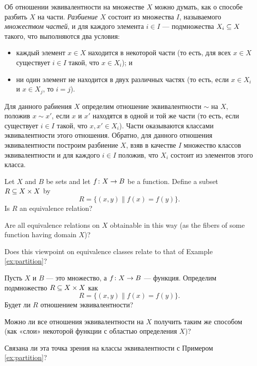 \documentclass[CT4S-EN-RU]{subfiles}
\begin{document}
\begin{exampleRUS}[Разбиения]\label{ex:partition}
Об отношении эквивалентности на множестве $X$ можно думать, как о способе разбить $X$ на части. {\em Разбиение $X$} состоит из множества $I$, называемого {\em множеством частей}, и для каждого элемента $i\in I$ — подмножества $X_i\ss X$ такого, что выполняются два условия:
\begin{itemize}
\item каждый элемент $x\in X$ находится в некоторой части (то есть, для всех $x\in X$ существует $i\in I$ такой, что $x\in X_i$); и
\item ни один элемент не находится в двух различных частях (то есть, если $x\in X_i$ и $x\in X_j$, то $i=j$).
\end{itemize}

Для данного рабиения $X$ определим отношение эквивалентности $\sim$ на $X$, положив $x\sim x'$, если $x$ и $x'$ находятся в одной и той же части (то есть, если существует $i\in I$ такой, что $x,x'\in X_i$). Части оказываются классами эквивалентности этого отношения. Обратно, для данного отношения эквивалентности построим разбиение $X$, взяв в качестве $I$ множество классов эквивалентности и для каждого $i\in I$ положив, что $X_i$ состоит из элементов этого класса.
\end{exampleRUS}

\begin{exerciseENG}
Let $X$ and $B$ be sets and let $f\taking X\to B$ be a function. Define a subset $R\ss X\times X$ by $$R=\{(x,y)\|f(x)=f(y)\}.$$ 
\sexc Is $R$ an equivalence relation? 
\item Are all equivalence relations on $X$ obtainable in this way (as the fibers of some function having domain $X$)?
\item Does this viewpoint on equivalence classes relate to that of Example \ref{ex:partition}?
\endsexc
\end{exerciseENG}

\begin{exerciseRUS}
Пусть $X$ и $B$ — это множество, а $f\taking X\to B$ — функция. Определим подмножество $R\ss X\times X$ как $$R=\{(x,y)\|f(x)=f(y)\}.$$ 
\sexc Будет ли $R$ отношением эквивалентности? 
\item Можно ли все отношения эквивалентности на $X$ получить таким же способом (как «слои» некоторой функции с областью определения $X$)?
\item Связана ли эта точка зрения на классы эквивалентности с Примером \ref{ex:partition}?
\endsexc
\end{exerciseRUS}
\end{document}

